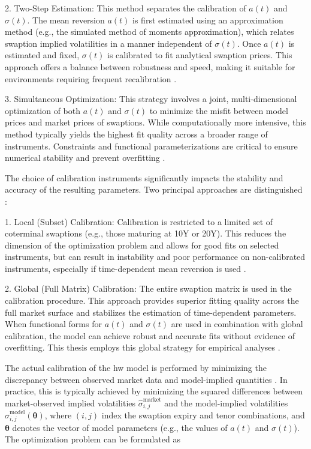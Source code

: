 2. Two-Step Estimation: This method separates the calibration of $a(t)$ and $\sigma(t)$. The mean reversion $a(t)$ is first estimated using an approximation method (e.g., the simulated method of moments approximation), which relates swaption implied volatilities in a manner independent of $\sigma(t)$. Once $a(t)$ is estimated and fixed, $\sigma(t)$ is calibrated to fit analytical swaption prices. This approach offers a balance between robustness and speed, making it suitable for environments requiring frequent recalibration \parencite[pp.~13--14]{gurrieri2009calibration}.

3. Simultaneous Optimization: This strategy involves a joint, multi-dimensional optimization of both $a(t)$ and $\sigma(t)$ to minimize the misfit between model prices and market prices of swaptions. While computationally more intensive, this method typically yields the highest fit quality across a broader range of instruments. Constraints and functional parameterizations are critical to ensure numerical stability and prevent overfitting \parencite[p.~14]{gurrieri2009calibration}.

The choice of calibration instruments significantly impacts the stability and accuracy of the resulting parameters. Two principal approaches are distinguished \parencite[p.~16]{gurrieri2009calibration}:

1. Local (Subset) Calibration: Calibration is restricted to a limited set of coterminal swaptions (e.g., those maturing at 10Y or 20Y). This reduces the dimension of the optimization problem and allows for good fits on selected instruments, but can result in instability and poor performance on non-calibrated instruments, especially if time-dependent mean reversion is used \parencite[pp.~16--24]{gurrieri2009calibration}.

2. Global (Full Matrix) Calibration: The entire swaption matrix is used in the calibration procedure. This approach provides superior fitting quality across the full market surface and stabilizes the estimation of time-dependent parameters. When functional forms for $a(t)$ and $\sigma(t)$ are used in combination with global calibration, the model can achieve robust and accurate fits without evidence of overfitting. This thesis employs this global strategy for empirical analyses \parencite[pp.~24--29]{gurrieri2009calibration}.

The actual calibration of the \ac{hw} model is performed by minimizing the discrepancy between observed market data and model-implied quantities \parencite[p.~2]{alaya2021deep}. In practice, this is typically achieved by minimizing the squared differences between market-observed implied volatilities $\hat{\sigma}^{\text{market}}_{i,j}$ and the model-implied volatilities $\hat{\sigma}^{\text{model}}_{i,j}(\boldsymbol{\theta})$, where $(i,j)$ index the swaption expiry and tenor combinations, and $\boldsymbol{\theta}$ denotes the vector of model parameters (e.g., the values of $a(t)$ and $\sigma(t)$). The optimization problem can be formulated as

